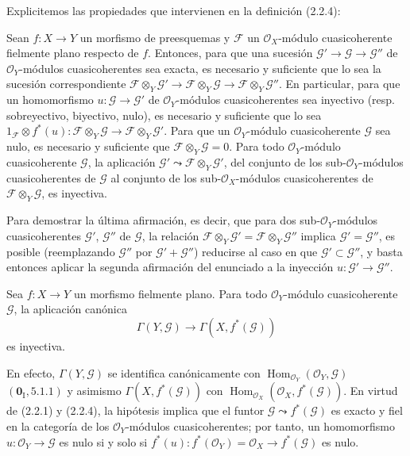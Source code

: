 Explicitemos las propiedades que intervienen en la definición (2.2.4):

\begin{proposition}[2.2.7]
\label{IV.2.2.7-fr}
Sean $f:X\to Y$ un morfismo de preesquemas y $\mathscr F$ un
$\mathcal O_X$-módulo cuasicoherente fielmente plano respecto de $f$.
Entonces, para que una sucesión
$\mathscr G'\to\mathscr G\to\mathscr G''$ de
$\mathcal O_Y$-módulos cuasicoherentes sea exacta, es necesario y suficiente
que lo sea la sucesión correspondiente
$\mathscr F\otimes_Y\mathscr G'\to\mathscr F\otimes_Y\mathscr G
\to\mathscr F\otimes_Y\mathscr G''$. En particular, para que un homomorfismo
$u:\mathscr G\to\mathscr G'$ de $\mathcal O_Y$-módulos cuasicoherentes sea
inyectivo \textup{(resp.} sobreyectivo, biyectivo, nulo), es necesario y suficiente que
lo sea $1_{\mathscr F}\otimes f^*(u):
\mathscr F\otimes_Y\mathscr G\to\mathscr F\otimes_Y\mathscr G'$. Para que un
$\mathcal O_Y$-módulo cuasicoherente $\mathscr G$ sea nulo, es necesario y
suficiente que $\mathscr F\otimes_Y\mathscr G=0$. Para todo
$\mathcal O_Y$-módulo cuasicoherente $\mathscr G$, la aplicación
$\mathscr G'\leadsto\mathscr F\otimes_Y\mathscr G'$, del conjunto de los
sub-$\mathcal O_Y$-módulos cuasicoherentes de $\mathscr G$ al conjunto de los
sub-$\mathcal O_X$-módulos cuasicoherentes de
$\mathscr F\otimes_Y\mathscr G$, es inyectiva.
\end{proposition}

Para demostrar la última afirmación, es decir, que para dos
sub-$\mathcal O_Y$-módulos cuasicoherentes $\mathscr G'$, $\mathscr G''$ de
$\mathscr G$, la relación
$\mathscr F\otimes_Y\mathscr G'=\mathscr F\otimes_Y\mathscr G''$ implica
$\mathscr G'=\mathscr G''$, es posible (reemplazando $\mathscr G''$ por
$\mathscr G'+\mathscr G''$) reducirse al caso en que
$\mathscr G'\subset\mathscr G''$, y basta entonces aplicar la segunda
afirmación del enunciado a la inyección $u:\mathscr G'\to\mathscr G''$.

\begin{corollary}[2.2.8]
\label{IV.2.2.8-fr}
Sea $f:X\to Y$ un morfismo fielmente plano. Para todo
$\mathcal O_Y$-módulo cuasicoherente $\mathscr G$, la aplicación canónica
\begin{equation}
\tag{2.2.8.1}
\label{IV.2.2.8.1-fr}
\Gamma(Y,\mathscr G)\longrightarrow\Gamma(X,f^*(\mathscr G))
\end{equation}
es inyectiva.
\end{corollary}

En efecto, $\Gamma(Y,\mathscr G)$ se identifica canónicamente con
$\operatorname{Hom}_{\mathcal O_Y}(\mathcal O_Y,\mathscr G)$
$(\mathbf{0}_{\mathrm I},5.1.1)$ y asimismo $\Gamma(X,f^*(\mathscr G))$ con
$\operatorname{Hom}_{\mathcal O_X}(\mathcal O_X,f^*(\mathscr G))$. En virtud
de (2.2.1) y (2.2.4), la hipótesis implica que el funtor
$\mathscr G\leadsto f^*(\mathscr G)$ es exacto y fiel en la categoría de los
$\mathcal O_Y$-módulos cuasicoherentes; por tanto, un homomorfismo
$u:\mathcal O_Y\to\mathscr G$ es nulo si y solo si
$f^*(u):f^*(\mathcal O_Y)=\mathcal O_X\to f^*(\mathscr G)$ es nulo.

